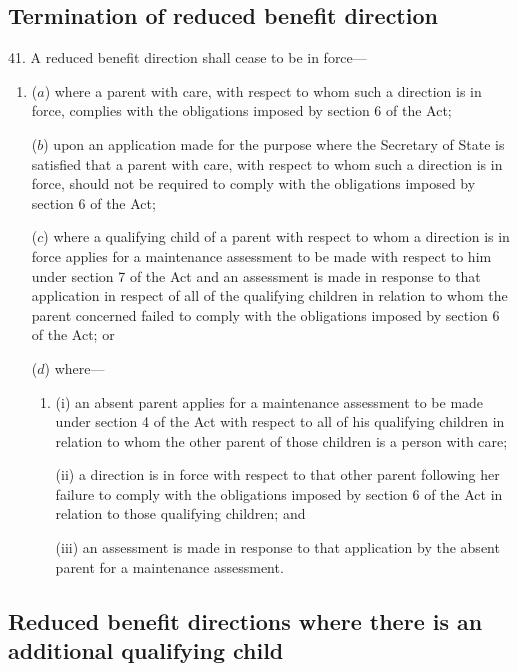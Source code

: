 \documentclass[a4paper,12pt]{article}
\begin{document}

\subsection[41. Termination of reduced benefit direction]{Termination of reduced benefit direction}

41.  A reduced benefit direction shall cease to be in force---
\begin{enumerate}\item[]
($a$) where a parent with care, with respect to whom such a direction is in force, complies with the obligations imposed by section 6 of the Act;

($b$) upon an application made for the purpose where the Secretary of State is satisfied that a parent with care, with respect to whom such a direction is in force, should not be required to comply with the obligations imposed by section 6 of the Act;

($c$) where a qualifying child of a parent with respect to whom a direction is in force applies for a maintenance assessment to be made with respect to him under section 7 of the Act and an assessment is made in response to that application in respect of all of the qualifying children in relation to whom the parent concerned failed to comply with the obligations imposed by section 6 of the Act; or

($d$) where---
\begin{enumerate}\item[]
(i) an absent parent applies for a maintenance assessment to be made under section 4 of the Act with respect to all of his qualifying children in relation to whom the other parent of those children is a person with care;

(ii) a direction is in force with respect to that other parent following her failure to comply with the obligations imposed by section 6 of the Act in relation to those qualifying children; and

(iii) an assessment is made in response to that application by the absent parent for a maintenance assessment.
\end{enumerate}
\end{enumerate}


\subsection[47. Reduced benefit directions where there is an additional qualifying child]{\sloppy Reduced benefit directions where there is an additional qualifying child}
\end{document}
